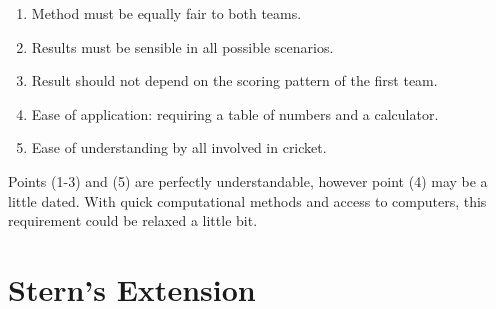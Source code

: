 \begin{enumerate}
	\item Method must be equally fair to both teams.
	\vspace{0.02cm}
	\item Results must be sensible in all possible scenarios.
	\vspace{0.02cm}
	\item Result should not depend on the scoring pattern of the first team.
	\vspace{0.02cm}
	\item Ease of application: requiring a table of numbers and a calculator.
	\vspace{0.02cm}
	\item Ease of understanding by all involved in cricket.
\end{enumerate}

Points (1-3) and (5) are perfectly understandable, however point (4) may be a little dated. With quick computational methods and access to computers, this requirement could be relaxed a little bit.


\section{Stern's Extension}